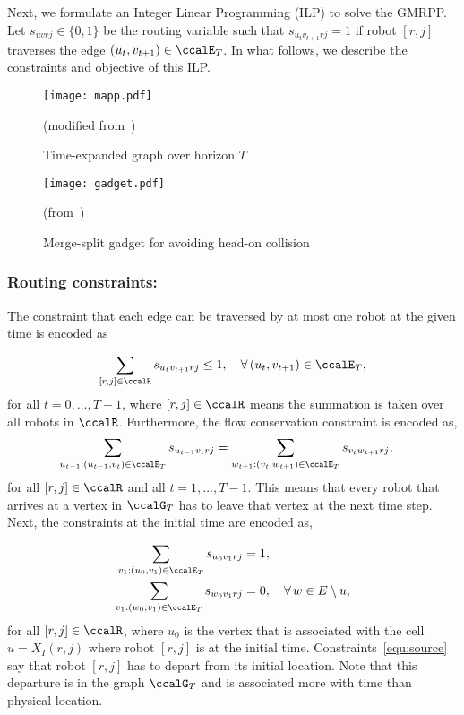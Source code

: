 \documentclass[Afour,sageh,times]{sagej}
\begin{document}
{{{Next, we formulate an Integer Linear Programming (ILP) to solve the GMRPP. Let $s_{uvrj} \in\{0,1\}$ be the routing variable such that $s_{u_{t}v_{t+1}rj} = 1$ if robot $[r,j]$ traverses the edge $(u_t,v_{t+1}) \in \ccalE_T$. In what follows, we describe the constraints and objective of this ILP.
\begin{figure}[t]
  \centering
  \texttt{[image: mapp.pdf]}
  \caption{Time-expanded graph over horizon $T$} (modified from~\cite{yu2016optimal})
  \label{fig:mapp}
\end{figure}

\begin{figure}[t]
  \centering
  \texttt{[image: gadget.pdf]}
  \caption{Merge-split gadget for avoiding head-on collision} (from~\cite{yu2016optimal})
  \label{fig:gadget}
\end{figure}
\setcounter{subsection}{1}
\subsubsection{Routing constraints:}
The constraint that each edge can be traversed by at most one robot at the given time is encoded as}
\begingroup\makeatletter{}\check@mathfonts
\def\maketag@@@#1{\hbox{\m@th\normalsize\normalfont#1}}%
\begin{align}
  \sum_{[r,j] \in \ccalR} s_{u_t v_{t+1}rj} \leq 1, \quad \forall \,(u_t,v_{t+1}) \in \ccalE_T,
\end{align}
\endgroup
for all $t=0,\ldots, T-1$, where $[r,j]\in\ccalR$ means the summation is taken over all robots in $\ccalR$. Furthermore, the flow conservation constraint is encoded as,
\begingroup\makeatletter\def\f@size{10}\check@mathfonts
\def\maketag@@@#1{\hbox{\m@th\normalsize\normalfont#1}}%
\begingroup
  \begin{align}\label{equ:flow}
  \sum_{u_{t-1}:(u_{t-1}, v_t) \in \ccalE_T}   s_{u_{t-1} v_t rj} &  =   \sum_{w_{t+1}:(v_t, w_{t+1}) \in \ccalE_T} s_{v_t w_{t+1} rj},
  \end{align}
\endgroup
for all $[r,j]\in \ccalR$ and all $t=1,\ldots,T-1$. This means that every robot that arrives at a vertex in $\ccalG_T$ has to leave that vertex at the next time step. Next, the constraints at the initial time are encoded as,
\begingroup\makeatletter\def\f@size{10}\check@mathfonts
\def\maketag@@@#1{\hbox{\m@th\normalsize\normalfont#1}}%
\begingroup

\begin{subequations}\label{equ:source}
  \begin{align}
    \sum_{v_1:(u_0, v_1) \in \ccalE_T} s_{u_0v_1 rj} &  = 1,  \\
    \sum_{v_1:(w_0, v_1) \in \ccalE_T} s_{w_0v_1 rj} & = 0, \quad \forall\, w \in E\setminus u,
  \end{align}
\end{subequations}
\endgroup
for all $[r,j]\in \ccalR$, where $u_0$ is the vertex that is associated with the cell $u = X_I(r,j)$ where robot $[r,j]$ is at the initial time. Constraints~\eqref{equ:source} say that robot $[r,j]$ has to depart from its initial location. Note that this departure is in the graph $\ccalG_T$ and is associated more with time than physical location.

}}
\end{document}

